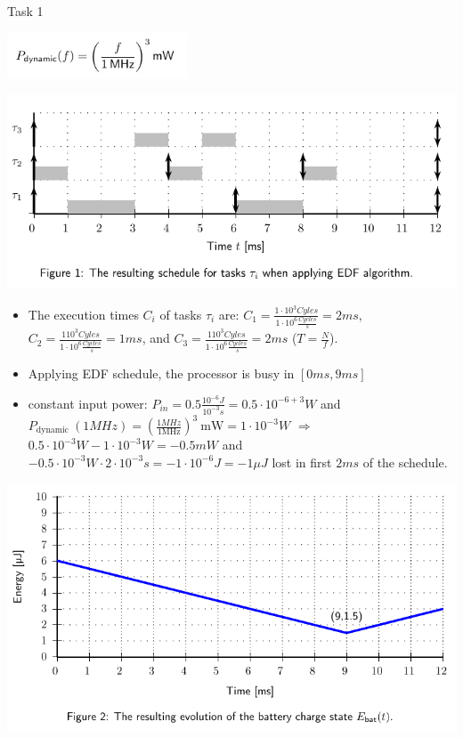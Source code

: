 \begin{frame}[allowframebreaks]{Task 1}{}
\begin{tasknoinc}
    \includegraphics[width=0.4\textwidth]{./figures/task1_power.png}
  \end{tasknoinc}
  \begin{solutionnoinc}
    \centering
    \includegraphics[height=0.6\paperheight]{./figures/task1_schedule.png}
  \end{solutionnoinc}
  \begin{solutionnoinc}
    \begin{itemize}
      \item The execution times $C_i$ of tasks $\tau_i$ are: $C_1 = \frac{1 \cdot 10^3 Cyles}{1 \cdot 10^6 \frac{Cycles}{s}} =  2 ms$, $C_2 = \frac{1 10^3 Cyles}{1 \cdot 10^6 \frac{Cycles}{s}} =  1 ms$, and $C_3 = \frac{1 10^3 Cyles}{1 \cdot 10^6 \frac{Cycles}{s}}  = 2 ms$ ($T = \frac{N}{f}$).
      \item Applying EDF schedule, the processor is busy in $[0 ms, 9 ms]$
      \item constant input power: $P_{in} = 0.5 \frac{10^{-6} J}{10^{-3} s} = 0.5 \cdot 10^{-6 + 3}W$ and $P_{\text {dynamic }}(1MHz)=\left(\frac{1MHz}{1 \mathrm{MHz}}\right)^3 \mathrm{~mW} = 1 \cdot 10^{-3} W$ $\Rightarrow$ $0.5 \cdot 10^{-3}W - 1 \cdot 10^{-3}W = -0.5 mW$ and $-0.5 \cdot 10^{-3}W \cdot 2 \cdot 10^{-3}s = -1 \cdot 10^{-6}J = -1\mu J$ lost in first $2ms$ of the schedule.
    \end{itemize}
  \end{solutionnoinc}
  \begin{solution}
    \centering
    \includegraphics[height=0.6\paperheight]{./figures/task1_energy.png}

\end{solution}
\end{frame}
